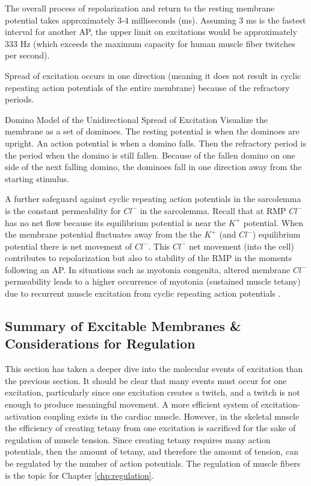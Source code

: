 The overall process of repolarization and return to the resting membrane potential takes approximately 3-4 milliseconds (ms). Assuming 3 ms is the fastest interval for another AP, the upper limit on excitations would be approximately 333 Hz (which exceeds the maximum capacity for human muscle fiber twitches per second).

Spread of excitation occurs in one direction (meaning it does not result in cyclic repeating action potentials of the entire membrane) because of the refractory periods. 

\begin{backgroundinformation}{Domino Model of the Unidirectional Spread of Excitation}
    Visualize the membrane as a set of dominoes. The resting potential is when the dominoes are upright. An action potential is when a domino falls. Then the refractory period is the period when the domino is still fallen. Because of the fallen domino on one side of the next falling domino, the dominoes fall in one direction away from the starting stimulus. 
\end{backgroundinformation}

A further safeguard against cyclic repeating action potentials in the sarcolemma is the constant permeability for $Cl^-$ in the sarcolemma. Recall that at RMP $Cl^-$ has no net flow because its equilibrium potential is near the $K^+$ potential. When the membrane potential fluctuates away from the the $K^+$ (and $Cl^-$) equilibrium potential there is net movement of $Cl^-$. This $Cl^-$ net movement (into the cell) contributes to repolarization but also to stability of the RMP in the moments following an AP. In situations such as myotonia congenita, altered membrane $Cl^-$ permeability leads to a higher occurrence of myotonia (sustained muscle tetany) due to recurrent muscle excitation from cyclic repeating action potentials \cite{adrian_action_1976}.

\subsection{Summary of Excitable Membranes \& Considerations for Regulation}

This section has taken a deeper dive into the molecular events of excitation than the previous section. It should be clear that many events must occur for one excitation, particularly since one excitation creates a twitch, and a twitch is not enough to produce meaningful movement. A more efficient system of excitation-activation coupling exists in the cardiac muscle. However, in the skeletal muscle the efficiency of creating tetany from one excitation is sacrificed for the sake of regulation of muscle tension. Since creating tetany requires many action potentials, then the amount of tetany, and therefore the amount of tension, can be regulated by the number of action potentials. The regulation of muscle fibers is the topic for Chapter \ref{chp:regulation}.


